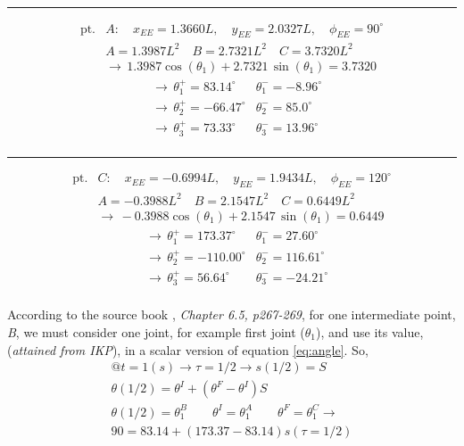 \documentclass[conference]{IEEEtran}
\begin{document}
\hrule
\begin{align*}
    \text{pt.} & A:\quad x_{EE} = 1.3660L,\quad y_{EE} = 2.0327L,\quad \phi_{EE} = 90^\circ \\
               & A = 1.3987 L^2 \quad B = 2.7321 L^2 \quad C = 3.7320 L^2                   \\
               & \rightarrow \,1.3987 \cos (\theta_1) + 2.7321 \, \sin (\theta_1) =  3.7320
\end{align*}
\begin{align*}
     & \rightarrow \, \theta_1^+ = 83.14^\circ  & \theta_1^- = -8.96^\circ \\
     & \rightarrow \, \theta_2^+ = -66.47^\circ & \theta_2^- = 85.0^\circ  \\
     & \rightarrow \, \theta_3^+ = 73.33^\circ  & \theta_3^- = 13.96^\circ \\
\end{align*}
\hrule
\begin{align*}
    \text{pt.} & C:\quad  x_{EE} = -0.6994L,\quad y_{EE} = 1.9434L,\quad \phi_{EE} = 120^\circ \\
               & A = -0.3988 L^2 \quad B = 2.1547 L^2 \quad C = 0.6449 L^2                     \\
               & \rightarrow \, -0.3988 \cos (\theta_1) + 2.1547 \, \sin (\theta_1) =  0.6449
\end{align*}
\begin{align*}
     & \rightarrow \, \theta_1^+ = 173.37^\circ  & \theta_1^- = 27.60^\circ  \\
     & \rightarrow \, \theta_2^+ = -110.00^\circ & \theta_2^- = 116.61^\circ \\
     & \rightarrow \, \theta_3^+ = 56.64^\circ   & \theta_3^- = -24.21^\circ \\
\end{align*}


According to the source book \cite{b1}, \textit{Chapter 6.5, p267-269}, for one intermediate point, \textit{B}, we must consider one joint, for example first joint ($\theta_1$), and use its value, (\textit{attained from IKP}), in a scalar version of equation \ref{eq:angle}. So,
\begin{gather*}
    @ t = 1(s) \rightarrow \tau = 1/2 \rightarrow s(1/2) = S\\
    \theta(1/2) = \theta^I + \left(\theta^F - \theta^I\right) S \\
    \theta(1/2) = \theta_1^B \quad\quad \theta^I = \theta_1^A \quad\quad \theta^F = \theta_1^C \rightarrow \\
    90 = 83.14 + (173.37 - 83.14) s(\tau = 1/2)
\end{gather*}
\end{document}
